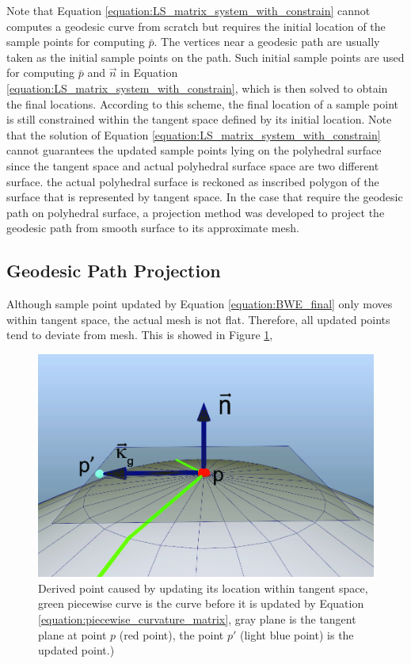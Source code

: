 Note that Equation \ref{equation:LS_matrix_system_with_constrain} cannot computes a geodesic curve from scratch but requires the initial location of the sample points for computing $\bar{p}$.  The vertices near a geodesic path are usually taken as the initial sample points on the path. Such initial sample points are used for computing $\bar{p}$ and $\vec{n}$ in Equation \ref{equation:LS_matrix_system_with_constrain}, which is then solved to obtain the final locations. According to this scheme, the final location of a sample point is still constrained within the tangent space defined by its initial location.  Note that the solution of Equation \ref{equation:LS_matrix_system_with_constrain} cannot guarantees the updated sample points lying on the polyhedral surface since the tangent space and actual polyhedral surface space are two different surface. the actual polyhedral surface is reckoned as inscribed polygon of the surface that is represented by tangent space. In the case that require the geodesic path on polyhedral surface, a projection method was developed to project the geodesic path from smooth surface to its approximate mesh. 

\subsection{Geodesic Path Projection}
Although sample point updated by Equation \ref{equation:BWE_final} only moves within tangent space, the actual mesh is not flat. Therefore, all updated points tend to deviate from mesh. This is showed in Figure \ref{figure:geodesic_offset1},

\begin{figure}[H]
    \centering
    \includegraphics[width=0.9\columnwidth]{../images/geodesic_image/offset_point}
    \caption[Derived point caused by updating its location within tangent space.]{Derived point caused by updating its location within tangent space, green piecewise curve is the curve before it is updated by Equation \ref{equation:piecewise_curvature_matrix}, gray plane is the tangent plane at point $p$ (red point), the point $p'$ (light blue point) is the updated point.)}
    \label{figure:geodesic_offset1}
\end{figure}  

